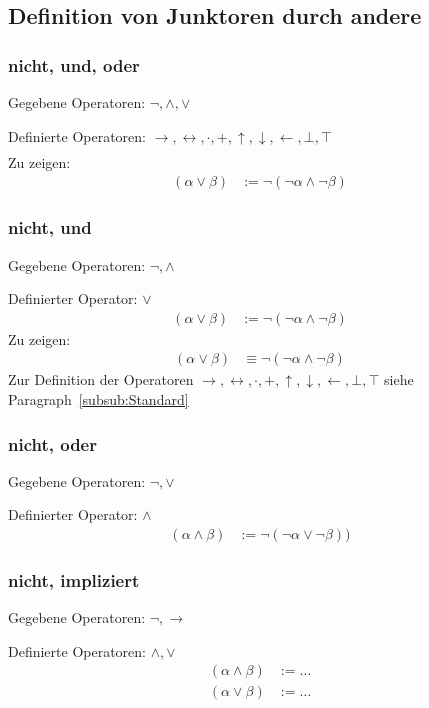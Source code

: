 \documentclass[english,ngerman,parskip=half,headsepline,footsepline,
	fleqn,notitlepage]{scrreprt}
\newcommand*{\defeq}{:=}%
\newcommand*{\ladd}{+}
\newcommand*{\lmult}{\cdot}
\newcommand*{\ltrue}{\top}%
\newcommand*{\lfalse}{\bot}%
\newcommand*{\lrep}{\leftarrow}%
\newcommand*{\limp}{\rightarrow}%
\newcommand*{\lequiv}{\leftrightarrow}%
\newcommand*{\lnand}{\uparrow}%
\newcommand*{\lnor}{\downarrow}%
\newcommand*{\subsubsectionname}{Paragraph}
\begin{document}
	\subsection{Definition von Junktoren durch andere}%
	\label{sub:Junktordefinitionen}

	\subsubsection{nicht, und, oder}%
	\label{subsub:Standard}
	\label{subsub:OperatorenAnfang}
	Gegebene Operatoren: $\lnot, \land, \lor$\par
	Definierte Operatoren:
	$\limp, \lequiv, \lmult, \ladd, \lnand, \lnor, \lrep, \lfalse, \ltrue$
	\begin{align}
	\end{align}
	Zu zeigen:
	\begin{align}
		(\alpha\lor\beta)&\defeq\lnot(\lnot\alpha\land\lnot\beta)
	\end{align}

	\subsubsection{nicht, und}%
	Gegebene Operatoren: $\lnot, \land$\par
	Definierter Operator: $\lor$
	\begin{align}
		(\alpha\lor\beta)&\defeq\lnot(\lnot\alpha\land\lnot\beta)
	\end{align}
	Zu zeigen:
	\begin{align}
		(\alpha\lor\beta)&\equiv\lnot(\lnot\alpha\land\lnot\beta)
	\end{align}
	Zur Definition der Operatoren $\limp, \lequiv, \lmult, \ladd, \lnand, \lnor,
	\lrep, \lfalse, \ltrue$ siehe \subsubsectionname~\vref{subsub:Standard}

	\subsubsection{nicht, oder}%
	Gegebene Operatoren: $\lnot, \lor$\par
	Definierter Operator: $\land$
	\begin{align}
		(\alpha\land\beta)&\defeq\lnot(\lnot\alpha\lor\lnot\beta))
	\end{align}

	\subsubsection{nicht, impliziert}%
	Gegebene Operatoren: $\lnot, \limp$\par
	Definierte Operatoren: $\land, \lor$
	\begin{align}
		(\alpha\land\beta)&\defeq\dots\\
		(\alpha\lor\beta)&\defeq\dots
	\end{align}
\end{document}
